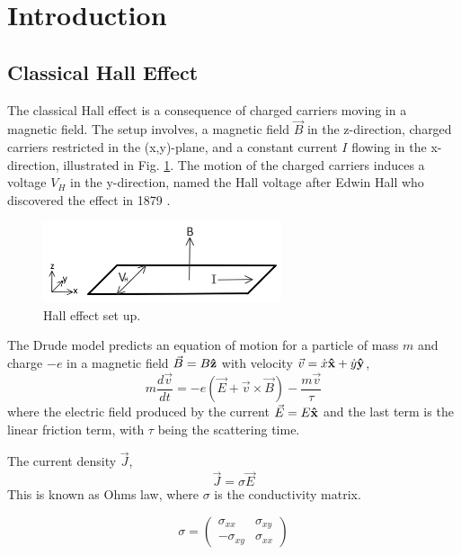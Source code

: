 \section{Introduction}


\subsection{Classical Hall Effect}
The classical Hall effect is a consequence of charged carriers moving in a magnetic field. The setup involves, a magnetic field $\vec{B}$ in the z-direction, charged carriers restricted in the (x,y)-plane, and a constant current $I$ flowing in the x-direction, illustrated in Fig. \ref{classical-hall-effect}. The motion of the charged carriers induces a voltage $V_H$ in the y-direction, named the Hall voltage after Edwin Hall who discovered the effect in 1879 \cite{tong_notes}.

\begin{figure}[h!]
    \centering
    \includegraphics[width=7cm]{figures/hall effect set up.png}
    \caption{Hall effect set up.} 
    \label{classical-hall-effect}
\end{figure}

The Drude model predicts an equation of motion for a particle of mass $m$ and charge $-e$ in a magnetic field $\vec{B} = B\boldsymbol{\hat{\textbf{z}}}$ with velocity $\vec{v} = \dot{x}\boldsymbol{\hat{\textbf{x}}} + \dot{y}\boldsymbol{\hat{\textbf{y}}}$,
\begin{equation}
    m \frac{d\vec{v}}{dt} = -e(\vec{E} + \vec{v} \times \vec{B}) - \frac{m\vec{v}}{\tau}
\end{equation}
where the electric field produced by the current $\vec{E} = E\boldsymbol{\hat{\textbf{x}}}$ and the last term is the linear friction term, with $\tau$ being  the scattering time. 

The current density $\vec{J}$,
\begin{equation}
    \vec{J} = \sigma \vec{E}
\end{equation}
This is known as Ohms law, where $\sigma$ is the conductivity matrix.

\begin{equation}
    \sigma = 
    \begin{pmatrix}
    \sigma_{xx} & \sigma_{xy}  \\
    -\sigma_{xy} & \sigma_{xx} 
    \end{pmatrix}
\end{equation}

